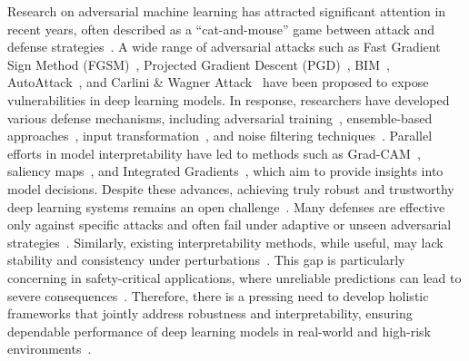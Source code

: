 \documentclass[a4paper,11pt]{article}
\begin{document}
Research on adversarial machine learning has attracted significant attention in recent years, often described as a “cat-and-mouse” game between attack and defense strategies~\cite{PM+17,BR18}. A wide range of adversarial attacks such as Fast Gradient Sign Method (FGSM)~\cite{goodfellow2015explainingharnessingadversarialexamples}, Projected Gradient Descent (PGD)~\cite{madry2019deeplearningmodelsresistant}, BIM~\cite{kurakin2017adversarialexamplesphysicalworld}, AutoAttack~\cite{CH20}, and Carlini \& Wagner Attack~\cite{carlini2017evaluatingrobustnessneuralnetworks} have been proposed to expose vulnerabilities in deep learning models. In response, researchers have developed various defense mechanisms, including adversarial training~\cite{madry2019deeplearningmodelsresistant}, ensemble-based approaches~\cite{D00}, input transformation~\cite{guo2018counteringadversarialimagesusing}, and noise filtering techniques~\cite{ZL+23}. Parallel efforts in model interpretability have led to methods such as Grad-CAM~\cite{SC+17}, saliency maps~\cite{simonyan2014deepinsideconvolutionalnetworks}, and Integrated Gradients~\cite{STY17}, which aim to provide insights into model decisions. Despite these advances, achieving truly robust and trustworthy deep learning systems remains an open challenge~\cite{tsipras2019robustnessoddsaccuracy}. Many defenses are effective only against specific attacks and often fail under adaptive or unseen adversarial strategies~\cite{uesato2018adversarialriskdangersevaluating}. Similarly, existing interpretability methods, while useful, may lack stability and consistency under perturbations~\cite{GAZ19}. This gap is particularly concerning in safety-critical applications, where unreliable predictions can lead to severe consequences~\cite{LZ24}. Therefore, there is a pressing need to develop holistic frameworks that jointly address robustness and interpretability, ensuring dependable performance of deep learning models in real-world and high-risk environments~\cite{LZ24,tsipras2019robustnessoddsaccuracy}.
\end{document}

